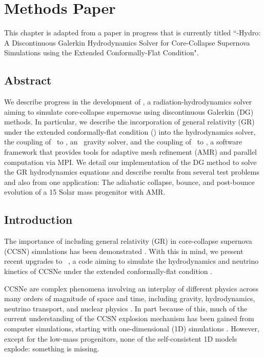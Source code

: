 \chapter{Methods Paper}
\label{ch.mp}

This chapter is adapted from
a paper in progress that is currently titled
``\thornado-Hydro: A Discontinuous Galerkin Hydrodynamics Solver for
Core-Collapse Supernova Simulations using the
Extended Conformally-Flat Condition".

\section{Abstract}

We describe progress in the development of \thornado, a radiation-hydrodynamics
solver aiming to simulate core-collapse supernovae using discontinuous Galerkin
(DG) methods.
In particular, we describe the incorporation of general relativity (GR) under
the extended conformally-flat condition (\xcfc) into the hydrodynamics solver,
the coupling of \thornado\ to \poseidon, an \xcfc\ gravity solver, and the
coupling of \thornado\ to \amrex, a software framework that provides tools for
adaptive mesh refinement (AMR) and parallel computation via MPI.
We detail our implementation of the DG method to solve the GR hydrodynamics
equations and describe results from several test problems and also from one
application: The adiabatic collapse, bounce, and post-bounce evolution of a
15 Solar mass progenitor with AMR.

\section{Introduction}

The importance of including general relativity (GR) in core-collapse supernova
(CCSN) simulations has been demonstrated
\citep{bdm2001,mjm2012,lmm2012,oc2018}.
With this in mind, we present recent upgrades to \thornado\ \citep{pbe2021},
a code aiming to simulate the hydrodynamics and neutrino kinetics of CCSNe under
the extended conformally-flat condition \citep[\xcfc;][]{wmm1996,ccd2009}.

CCSNe are complex phenomena involving an interplay of different physics
across many orders of magnitude of space and time, including gravity,
hydrodynamics, neutrino transport, and nuclear physics
\citep[e.g., see][for reviews]{b1990,m2005,j2012,b2013,m2016,mem2020}.
In part because of this, much of the current understanding of the CCSN explosion
mechanism has been gained from computer simulations, starting with
one-dimensional (1D) simulations
\citep[e.g., see][]{%
cj1960,
mw1966,
cw1966,
r1979,
hm1981,
bw1985,
mim1991,
mb1993,
mb1993a,
mb1993b,
rj2000,
mlm2001,
rj2002,
twi2003,
tbp2003,
lmm2004,
kjh2006,
sys2007,
zwh2008,
hmj2010,
thr2017,
sro2019,
bmo2021,
gmm2023%
}.
However, except for the low-mass progenitors, none of the self-consistent 1D
models explode: something is missing.

